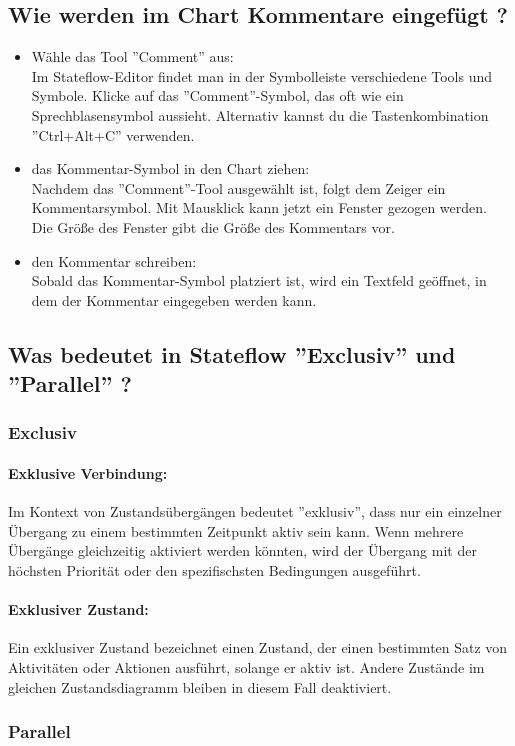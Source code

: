 \documentclass{article}
\begin{document}
\begin{multicols}{2}
		\subsection{Wie werden im Chart Kommentare eingefügt ?}
		\begin{itemize}
			\item Wähle das Tool ''Comment'' aus: \\Im Stateflow-Editor findet man in der Symbolleiste verschiedene Tools und Symbole. Klicke auf das ''Comment''-Symbol, das oft wie ein Sprechblasensymbol aussieht. Alternativ kannst du die Tastenkombination ''Ctrl+Alt+C'' verwenden.
			\item das Kommentar-Symbol in den Chart ziehen: \\Nachdem das ''Comment''-Tool ausgewählt ist, folgt dem Zeiger ein Kommentarsymbol. Mit Mausklick kann jetzt ein Fenster gezogen werden. Die Größe des Fenster gibt die Größe des Kommentars vor.
			\item den Kommentar schreiben: \\Sobald das Kommentar-Symbol platziert ist, wird ein Textfeld geöffnet, in dem der Kommentar eingegeben werden kann.
		\end{itemize}
		\subsection{Was bedeutet in Stateflow ''Exclusiv'' und ''Parallel'' ?}
			\subsubsection{Exclusiv}
				\paragraph{Exklusive Verbindung:}
					 Im Kontext von Zustandsübergängen bedeutet ''exklusiv'', dass nur ein einzelner Übergang zu einem bestimmten Zeitpunkt aktiv sein kann. Wenn mehrere Übergänge gleichzeitig aktiviert werden könnten, wird der Übergang mit der höchsten Priorität oder den spezifischsten Bedingungen ausgeführt.
				\paragraph{Exklusiver Zustand:}
					Ein exklusiver Zustand bezeichnet einen Zustand, der einen bestimmten Satz von Aktivitäten oder Aktionen ausführt, solange er aktiv ist. Andere Zustände im gleichen Zustandsdiagramm bleiben in diesem Fall deaktiviert.
			\subsubsection{Parallel}

\end{multicols}
\end{document}
